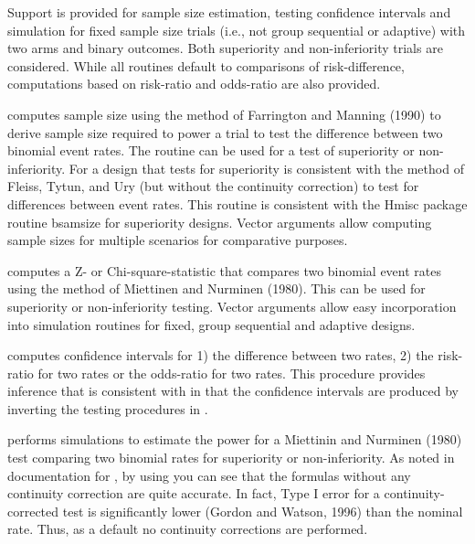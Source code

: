\begin{Description}\relax
Support is provided for sample size estimation, testing confidence intervals and simulation for fixed sample size trials 
(i.e., not group sequential or adaptive) with two arms and binary outcomes. 
Both superiority and non-inferiority trials are considered.
While all routines default to comparisons of risk-difference, 
computations based on risk-ratio and odds-ratio are also provided. 

 computes sample size using the method of Farrington and Manning (1990) to derive sample size
required to power a trial to test the difference between two binomial event rates. 
The routine can be used for a test of superiority or non-inferiority.
For a design that tests for superiority  is consistent with the method of Fleiss, Tytun, and Ury 
(but without the continuity correction) to test for differences between event rates.
This routine is consistent with the Hmisc package routine bsamsize for superiority designs.
Vector arguments allow computing sample sizes for multiple scenarios for comparative purposes.

 computes a Z- or Chi-square-statistic that compares two binomial event rates using 
the method of Miettinen and Nurminen (1980). This can be used for superiority or non-inferiority testing.
Vector arguments allow easy incorporation into simulation routines for fixed, group sequential and adaptive designs.

 computes confidence intervals for 1) the difference between two rates, 2) the risk-ratio for two rates 
or the odds-ratio for two rates. This procedure provides inference that is consistent with  in that 
the confidence intervals are produced by inverting the testing procedures in .

 performs simulations to estimate the power for a Miettinin and Nurminen (1980) test
comparing two binomial rates for superiority or non-inferiority. 
As noted in documentation for , by using  you can see that the formulas 
without any continuity correction are quite accurate. 
In fact, Type I error for a continuity-corrected test is significantly lower (Gordon and Watson, 1996)
than the nominal rate. 
Thus, as a default no continuity corrections are performed.
\end{Description}

